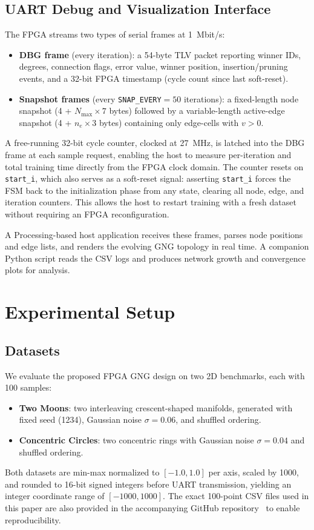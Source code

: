 \documentclass[conference]{IEEEtran}
\begin{document}
\subsection{UART Debug and Visualization Interface}
The FPGA streams two types of serial frames at 1~Mbit/s:
\begin{itemize}
  \item \textbf{DBG frame} (every iteration): a 54-byte TLV packet reporting winner IDs, degrees, connection flags, error value, winner position, insertion/pruning events, and a 32-bit FPGA timestamp (cycle count since last soft-reset).
  \item \textbf{Snapshot frames} (every \texttt{SNAP\_EVERY}$=50$ iterations): a fixed-length node snapshot (4 + $N_{\max} \times 7$ bytes) followed by a variable-length active-edge snapshot (4 + $n_e \times 3$ bytes) containing only edge-cells with $v > 0$.
\end{itemize}
A free-running 32-bit cycle counter, clocked at 27~MHz, is latched into the DBG frame at each sample request, enabling the host to measure per-iteration and total training time directly from the FPGA clock domain. The counter resets on \texttt{start\_i}, which also serves as a soft-reset signal: asserting \texttt{start\_i} forces the FSM back to the initialization phase from any state, clearing all node, edge, and iteration counters. This allows the host to restart training with a fresh dataset without requiring an FPGA reconfiguration.

A Processing-based host application receives these frames, parses node positions and edge lists, and renders the evolving GNG topology in real time. A companion Python script reads the CSV logs and produces network growth and convergence plots for analysis.


\section{Experimental Setup}

\subsection{Datasets}
We evaluate the proposed FPGA GNG design on two 2D benchmarks, each with 100 samples:
\begin{itemize}
  \item \textbf{Two Moons}: two interleaving crescent-shaped manifolds, generated with fixed seed (1234), Gaussian noise $\sigma=0.06$, and shuffled ordering.
  \item \textbf{Concentric Circles}: two concentric rings with Gaussian noise $\sigma=0.04$ and shuffled ordering.
\end{itemize}
Both datasets are min-max normalized to $[-1.0, 1.0]$ per axis, scaled by 1000, and rounded to 16-bit signed integers before UART transmission, yielding an integer coordinate range of $[-1000, 1000]$. The exact 100-point CSV files used in this paper are also provided in the accompanying GitHub repository~\cite{fpga_gng_repo} to enable reproducibility.
\end{document}
